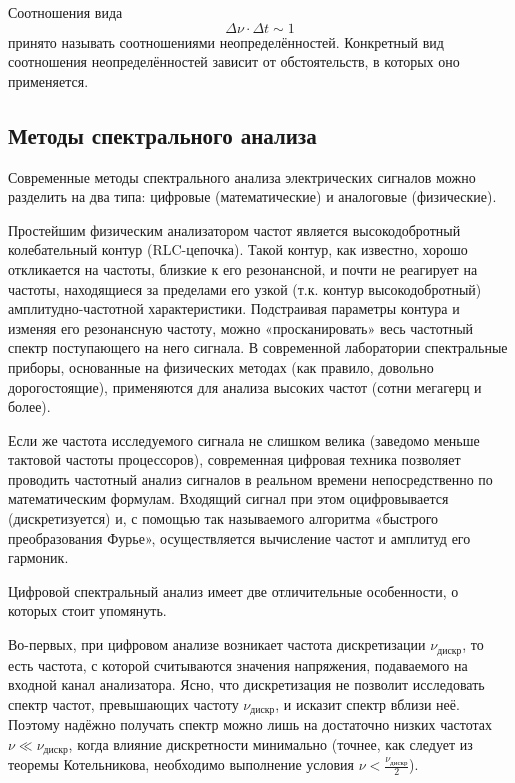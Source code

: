 \documentclass[a4paper,12pt]{article}
\begin{document}
Соотношения вида
\[
\Delta \nu \cdot \Delta t \sim 1
\]
принято называть соотношениями неопределённостей. Конкретный вид соотношения неопределённостей зависит от обстоятельств, в которых оно применяется.

\subsection*{Методы спектрального анализа}

Современные методы спектрального анализа электрических сигналов можно разделить на два типа: цифровые (математические) и аналоговые (физические).

Простейшим физическим анализатором частот является высокодобротный колебательный контур (RLC-цепочка). Такой контур, как известно, хорошо откликается на частоты, близкие к его резонансной, и почти не реагирует на частоты, находящиеся за пределами его узкой (т.к. контур высокодобротный) амплитудно-частотной характеристики. Подстраивая параметры контура и изменяя его резонансную частоту, можно «просканировать» весь частотный спектр поступающего на него сигнала. В современной лаборатории спектральные приборы, основанные на физических методах (как правило, довольно дорогостоящие), применяются для анализа высоких частот (сотни мегагерц и более).

Если же частота исследуемого сигнала не слишком велика (заведомо меньше тактовой частоты процессоров), современная цифровая техника позволяет проводить частотный анализ сигналов в реальном времени непосредственно по математическим формулам. Входящий сигнал при этом оцифровывается (дискретизуется) и, с помощью так называемого алгоритма «быстрого преобразования Фурье», осуществляется вычисление частот и амплитуд его гармоник.

Цифровой спектральный анализ имеет две отличительные особенности, о которых стоит упомянуть.

Во-первых, при цифровом анализе возникает частота дискретизации $\nu_{\text{дискр}}$, то есть частота, с которой считываются значения напряжения, подаваемого на входной канал анализатора. Ясно, что дискретизация не позволит исследовать спектр частот, превышающих частоту $\nu_{\text{дискр}}$, и исказит спектр вблизи неё. Поэтому надёжно получать спектр можно лишь на достаточно низких частотах $\nu \ll \nu_{\text{дискр}}$, когда влияние дискретности минимально (точнее, как следует из теоремы Котельникова, необходимо выполнение условия $\nu < \frac{\nu_{\text{дискр}}}{2}$).
\end{document}
